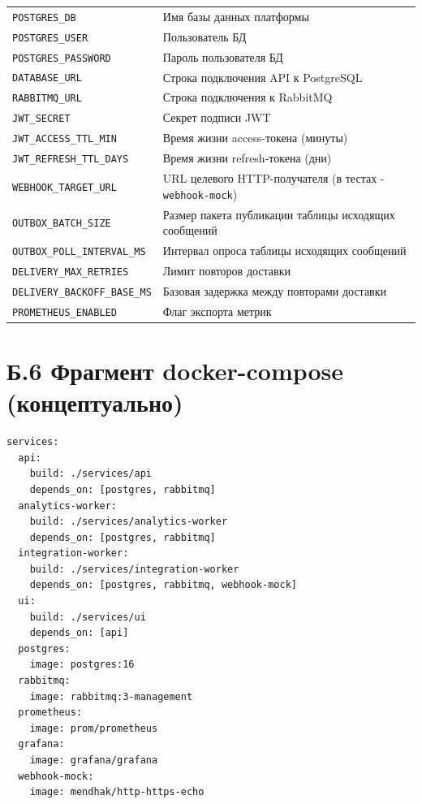 \begin{longtable}{@{}p{}p{}@{}}
\nolinkurl{POSTGRES_DB} & Имя базы данных платформы \\
\nolinkurl{POSTGRES_USER} & Пользователь БД \\
\nolinkurl{POSTGRES_PASSWORD} & Пароль пользователя БД \\
\nolinkurl{DATABASE_URL} & Строка подключения API к PostgreSQL \\
\nolinkurl{RABBITMQ_URL} & Строка подключения к RabbitMQ \\
\nolinkurl{JWT_SECRET} & Секрет подписи JWT \\
\nolinkurl{JWT_ACCESS_TTL_MIN} & Время жизни access-токена (минуты) \\
\nolinkurl{JWT_REFRESH_TTL_DAYS} & Время жизни refresh-токена (дни) \\
\nolinkurl{WEBHOOK_TARGET_URL} & URL целевого HTTP-получателя (в тестах - \texttt{webhook-mock}) \\
\nolinkurl{OUTBOX_BATCH_SIZE} & Размер пакета публикации таблицы исходящих сообщений \\
\nolinkurl{OUTBOX_POLL_INTERVAL_MS} & Интервал опроса таблицы исходящих сообщений \\
\nolinkurl{DELIVERY_MAX_RETRIES} & Лимит повторов доставки \\
\nolinkurl{DELIVERY_BACKOFF_BASE_MS} & Базовая задержка между повторами доставки \\
\nolinkurl{PROMETHEUS_ENABLED} & Флаг экспорта метрик \\
\end{longtable}

\section*{Б.6 Фрагмент docker-compose (концептуально)}
{}

\begin{verbatim}
services:
  api:
    build: ./services/api
    depends_on: [postgres, rabbitmq]
  analytics-worker:
    build: ./services/analytics-worker
    depends_on: [postgres, rabbitmq]
  integration-worker:
    build: ./services/integration-worker
    depends_on: [postgres, rabbitmq, webhook-mock]
  ui:
    build: ./services/ui
    depends_on: [api]
  postgres:
    image: postgres:16
  rabbitmq:
    image: rabbitmq:3-management
  prometheus:
    image: prom/prometheus
  grafana:
    image: grafana/grafana
  webhook-mock:
    image: mendhak/http-https-echo
\end{verbatim}

